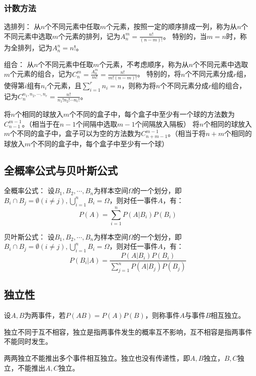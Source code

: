 \documentclass[a4paper,12pt]{ctexart}
\begin{document}
\subsubsection{计数方法}

选排列：
从$n$个不同元素中任取$m$个元素，按照一定的顺序排成一列，称为从$n$个不同元素中选取$m$个元素的排列，记为$A_n^m = \frac{n!}{(n-m)!}$。
特别的，当$m = n$时，称为全排列，记为$A_n^n = n!$。

组合：
从$n$个不同元素中任取$m$个元素，不考虑顺序，称为从$n$个不同元素中选取$m$个元素的组合，记为$C_n^m = \frac{A_n^m}{m!} = \frac{n!}{m!(n-m)!}$。
特别的，将$n$个不同元素分成$r$组，使得第$i$组有$n_i$个元素，且$\sum_{i=1}^rn_i = n$，则称为将$n$个不同元素分成$r$组的组合，记为$C_n^{n_1,n_2,\cdots,n_r} = \frac{n!}{n_1!n_2!\cdots n_r!}$。

将$n$个相同的球放入$m$个不同的盒子中，每个盒子中至少有一个球的方法数为$C_{n-1}^{m-1}$。（相当于在$n-1$个间隔中选取$m-1$个间隔放入隔板）
将$n$个相同的球放入$m$个不同的盒子中，盒子可以为空的方法数为$C_{n+m-1}^{m-1}$。（相当于将$n+m$个相同的球放入$m$个不同的盒子中，每个盒子中至少有一个球）

\subsection{全概率公式与贝叶斯公式}

全概率公式：
设$B_1,B_2,\cdots,B_n$为样本空间$\Omega$的一个划分，即$B_i\cap B_j = \emptyset(i\neq j),\bigcup_{i=1}^nB_i = \Omega$，则对任一事件$A$，有：
\begin{equation*}
	P(A) = \sum_{i=1}^nP(A|B_i)P(B_i)
\end{equation*}

贝叶斯公式：
设$B_1,B_2,\cdots,B_n$为样本空间$\Omega$的一个划分，即$B_i\cap B_j = \emptyset(i\neq j),\bigcup_{i=1}^nB_i = \Omega$，则对任一事件$A$，有：
\begin{equation*}
	P(B_i|A) = \frac{P(A|B_i)P(B_i)}{\sum_{j=1}^nP(A|B_j)P(B_j)}
\end{equation*}

\subsection{独立性}

设$A,B$为两事件，若$P(AB) = P(A)P(B)$，则称事件$A$与事件$B$相互独立。

独立不同于互不相容，独立是指两事件发生的概率互不影响，互不相容是指两事件不能同时发生。

两两独立不能推出多个事件相互独立。独立也没有传递性，即$A,B$独立，$B,C$独立，不能推出$A,C$独立。
\end{document}
